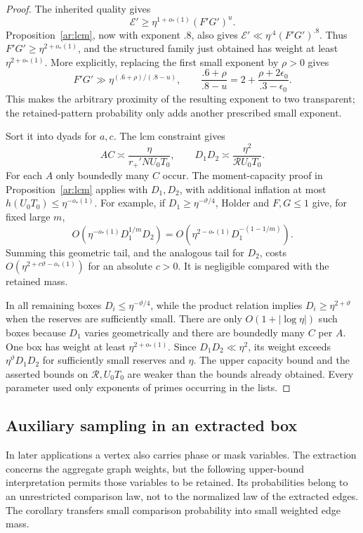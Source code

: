 \begin{proof}
The inherited quality gives
\[
 \mathcal E'\ge\eta^{1+o_*(1)}(F'G')^u.
\]
Proposition~\ref{ar:lcm}, now with exponent $.8$, also gives
$\mathcal E'\ll\eta^{.4}(F'G')^{.8}$. Thus
$F'G'\ge\eta^{2+o_*(1)}$, and the structured family just obtained
has weight at least $\eta^{2+o_*(1)}$.
More explicitly, replacing the first small exponent by $\rho>0$ gives
\[
 F'G'\gg\eta^{(.6+\rho)/(.8-u)},\qquad
 \frac{.6+\rho}{.8-u}
 =2+\frac{\rho+2\epsilon_0}{.3-\epsilon_0}.
\]
This makes the arbitrary proximity of the resulting exponent to two
transparent; the retained-pattern probability only adds another
prescribed small exponent.

Sort it into dyads for $a,c$. The lcm constraint gives
\[
 AC\asymp\frac{\eta}{r_+'NU_0T_0},\qquad
 D_1D_2\asymp\frac{\eta^2}{\mathcal R U_0T_0}.
\]
For each $A$ only boundedly many $C$ occur. The moment-capacity proof in
Proposition~\ref{ar:lcm} applies with $D_1,D_2$, with additional
inflation at most $h(U_0T_0)\le\eta^{-o_*(1)}$. For example, if
$D_1\ge\eta^{-\vartheta/4}$, Holder and $F,G\le1$ give, for fixed
large $m$,
\[
 O\left(\eta^{-o_*(1)}D_1^{1/m}D_2\right)
 =O\left(\eta^{2-o_*(1)}D_1^{-(1-1/m)}\right).
\]
Summing this geometric tail, and the analogous tail for $D_2$, costs
$O(\eta^{2+c\vartheta-o_*(1)})$ for an absolute $c>0$.
It is negligible compared with the retained mass.

In all remaining boxes $D_i\le\eta^{-\vartheta/4}$, while the product
relation implies $D_i\ge\eta^{2+\vartheta}$ when the reserves are
sufficiently small. There are only $O(1+|\log\eta|)$ such boxes because
$D_1$ varies geometrically and there are boundedly many $C$ per $A$.
One box has weight at least $\eta^{2+o_*(1)}$. Since
$D_1D_2\ll\eta^2$, its weight exceeds
$\eta^\vartheta D_1D_2$ for sufficiently small reserves and $\eta$.
The upper capacity bound and the asserted bounds on
$\mathcal R,U_0T_0$ are weaker than the bounds already obtained.
Every parameter used only exponents of primes occurring in the lists.
\end{proof}

\subsection{Auxiliary sampling in an extracted box}

In later applications a vertex also carries phase or mask variables.
The extraction concerns the aggregate graph weights, but the following
upper-bound interpretation permits those variables to be retained.
Its probabilities belong to an unrestricted comparison law, not to the
normalized law of the extracted edges. The corollary transfers small
comparison probability into small weighted edge mass.

